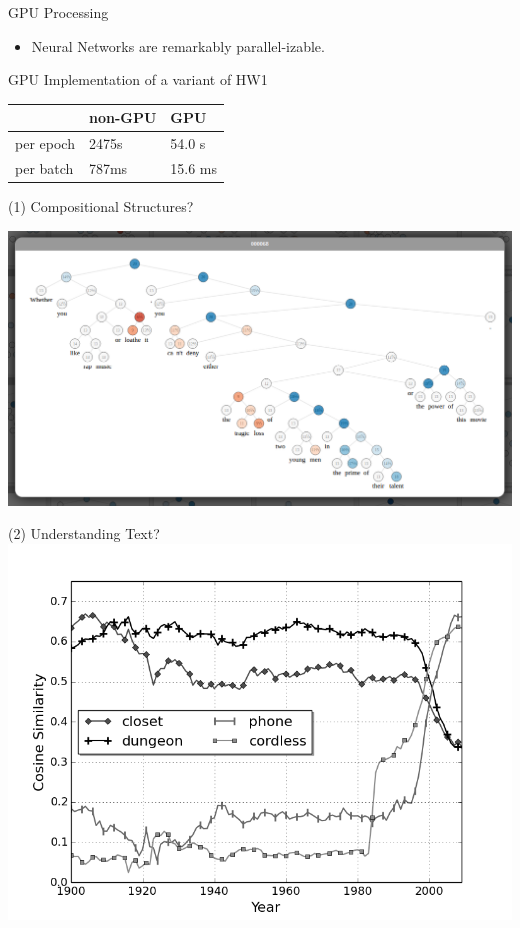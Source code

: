 \documentclass{beamer}
\begin{document}
\begin{frame}{GPU Processing}

  \begin{itemize}
  \item Neural Networks are remarkably parallel-izable. 
  \end{itemize}

  GPU Implementation of a variant of HW1  

  \begin{center}
    \begin{tabular}{lll}
      \toprule
      & non-GPU & GPU\\
      \midrule
      per epoch& 2475s & 54.0 s \\
      per batch & 787ms & 15.6 ms\\
      \bottomrule
    \end{tabular}
  \end{center}
\end{frame}

\begin{frame}{(1) Compositional Structures?}
  \begin{center}
    \includegraphics[width=\textwidth]{sentiment}
  \end{center}
\end{frame}

\begin{frame}{(2) Understanding Text?}
  \includegraphics[width=\textwidth]{cell}
\end{frame}
\end{document}
